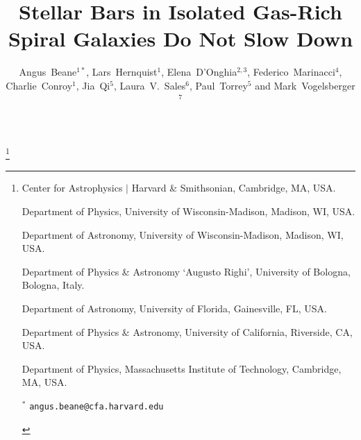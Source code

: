 \documentclass{natureprintstyle}
\title{Stellar Bars in Isolated Gas-Rich Spiral Galaxies Do Not Slow Down}
\author{Angus~Beane$^{1*}$, Lars~Hernquist$^1$, Elena~D'Onghia$^{2,3}$,
Federico~Marinacci$^{4}$, Charlie~Conroy$^{1}$, Jia~Qi$^{5}$,
Laura~V.~Sales$^{6}$, Paul~Torrey$^{5}$ and Mark~Vogelsberger$^{7}$
}
\begin{document}
\maketitle

{\let\thefootnote\relax\footnote{

\begin{affiliations}
\item Center for Astrophysics $|$ Harvard \& Smithsonian,  Cambridge, MA, USA.

\item Department of Physics, University of Wisconsin-Madison, Madison, WI, USA.

\item Department of Astronomy, University of Wisconsin-Madison, Madison, WI, USA.

\item Department of Physics \& Astronomy `Augusto Righi', University of Bologna, Bologna, Italy.

\item Department of Astronomy, University of Florida, Gainesville, FL, USA.

\item Department of Physics \& Astronomy, University of California, Riverside, CA, USA.

\item Department of Physics, Massachusetts Institute of Technology, Cambridge, MA, USA.

$^{*}$ \texttt{\mbox{angus.beane@cfa.harvard.edu}}

\end{affiliations}
}}

\end{document}
